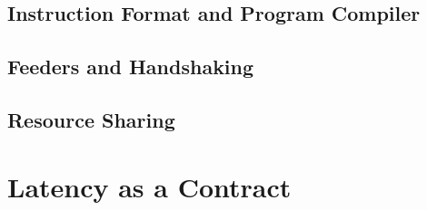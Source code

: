 \subsection{Instruction Format and Program Compiler}
\label{sec:isa-format}

\subsection{Feeders and Handshaking}
\label{sec:feeders}

\subsection{Resource Sharing}
\label{sec:sharing}

\section{Latency as a Contract}
\label{sec:latency-contract}
